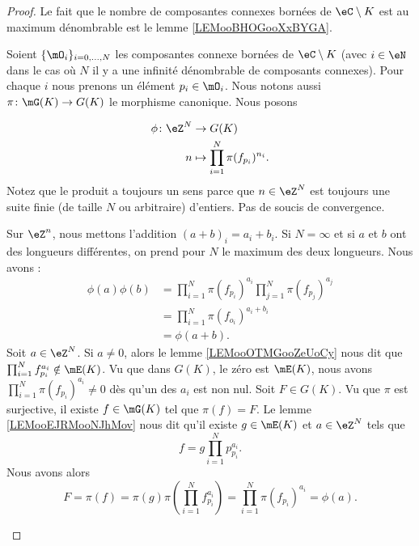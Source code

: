 \begin{proof}

	Le fait que le nombre de composantes connexes bornées de \( \eC\setminus K\) est au maximum dénombrable est le lemme \ref{LEMooBHOGooXxBYGA}.

	Soient \( \{ \mO_i \}_{i=0,\ldots,N}\) les composantes connexe bornées de \( \eC\setminus K\) (avec \( i\in \eN\) dans le cas où \( N\) il y a une infinité dénombrable de composants connexes). Pour chaque \( i\) nous prenons un élément \( p_i\in\mO_i\). Nous notons aussi \(\pi \colon \mG(K)\to G(K)  \) le morphisme canonique. Nous posons

	\begin{equation}
		\begin{aligned}
			\phi\colon \eZ^N & \to G(K)                                 \\
			n                & \mapsto \prod_{i=1}^N\pi(f_{p_i})^{n_i}.
		\end{aligned}
	\end{equation}
	Notez que le produit a toujours un sens parce que \( n\in \eZ^N\) est toujours une suite finie (de taille \( N\) ou arbitraire) d'entiers. Pas de soucis de convergence.
	\begin{subproof}
		Sur \( \eZ^n\), nous mettons l'addition \( (a+b)_i=a_i+b_i\). Si \( N=\infty\) et si \( a\) et \(b\) ont des longueurs différentes, on prend pour \( N\) le maximum des deux longueurs. Nous avons :
		\begin{subequations}
			\begin{align}
				\phi(a)\phi(b) & =\prod_{i=1}^N\pi(f_{p_i})^{a_i}\prod_{j=1}^N\pi(f_{p_j})^{a_j} \\
				               & =\prod_{i=1}^N\pi(f_{o_i})^{a_i+b_i}                            \\
				               & =\phi(a+b).
			\end{align}
		\end{subequations}
		Soit \( a\in \eZ^N\). Si \( a\neq 0\), alors le lemme \ref{LEMooOTMGooZeUoCy} nous dit que \( \prod_{i=1}^Nf_{p_i}^{a_i}\notin\mE(K)\). Vu que dans \( G(K)\), le zéro est \( \mE(K)\), nous avons \( \prod_{i=1}^N\pi(f_{p_i})^{a_i}\neq 0\) dès qu'un des \( a_i\) est non nul.
		Soit \( F\in G(K)\). Vu que \( \pi\) est surjective, il existe \( f\in \mG(K)\) tel que \( \pi(f)=F\). Le lemme \ref{LEMooEJRMooNJhMov} nous dit qu'il existe \( g\in\mE(K) \) et \( a\in \eZ^N\) tels que
		\begin{equation}
			f=g\prod_{i=1}^Np_{p_i}^{a_i}.
		\end{equation}
		Nous avons alors
		\begin{equation}
			F=\pi(f)=\pi(g)\pi\left(  \prod_{i=1}^Nf_{p_i}^{a_i} \right)=\prod_{i=1}^N\pi(f_{p_i})^{a_i}=\phi(a).
		\end{equation}
	\end{subproof}
\end{proof}

